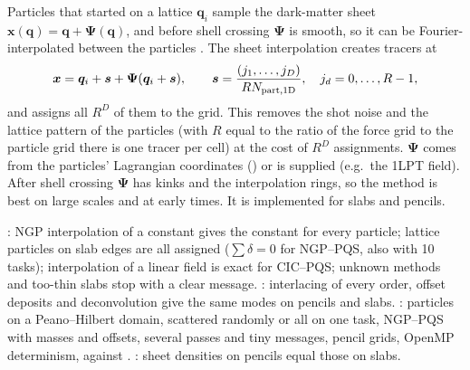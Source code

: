 Particles that started on a lattice $\bm q_i$ sample the dark-matter sheet $\bm x(\bm q)=\bm q+\bm\Psi(\bm q)$, and before shell crossing
$\bm\Psi$ is smooth, so it can be Fourier-interpolated between the particles \cite{Hahn2013,Stucker2020,List2024}. The sheet interpolation
creates tracers at
\begin{equation}
\bm x=\bm q_i+\bm s+\bm\Psi(\bm q_i+\bm s),\qquad \bm s=\frac{(j_1,\ldots,j_D)}{RN_{\rm part,1D}},\quad j_d=0,\ldots,R-1,
\end{equation}
and assigns all $R^D$ of them to the grid. This removes the shot noise and the lattice pattern of the particles (with $R$ equal to the ratio of
the force grid to the particle grid there is one tracer per cell) at the cost of $R^D$ assignments. $\bm\Psi$ comes from the particles'
Lagrangian coordinates () or is supplied (e.g.\ the 1LPT field). After shell crossing $\bm\Psi$ has kinks and the interpolation
rings, so the method is best on large scales and at early times. It is implemented for slabs and pencils.

\begin{validation}
: NGP interpolation of a constant gives the constant for every particle; lattice particles on slab
edges are all assigned ($\sum\delta=0$ for NGP--PQS, also with 10 tasks); interpolation of a linear field is exact for CIC--PQS; unknown
methods and too-thin slabs stop with a clear message. : interlacing of every order, offset deposits and
deconvolution give the same modes on pencils and slabs. : particles on a Peano--Hilbert domain,
scattered randomly or all on one task, NGP--PQS with masses and offsets, several passes and tiny messages, pencil grids, OpenMP
determinism, against . : sheet densities on pencils equal those on slabs.
\end{validation}
